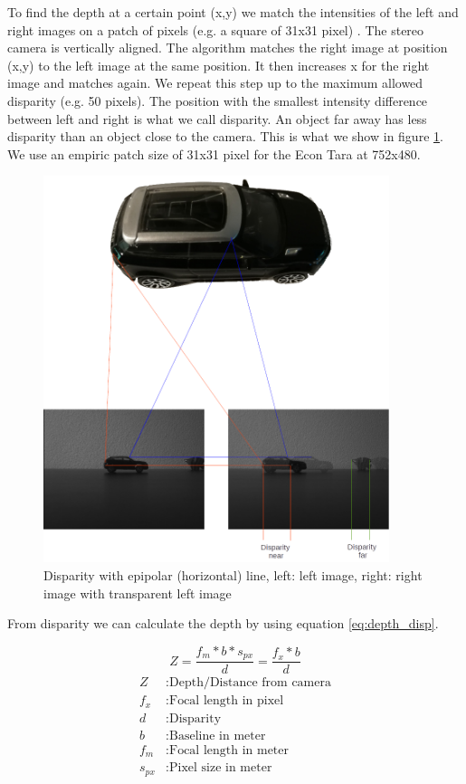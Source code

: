 \documentclass[11pt,a4paper,titlepage,oneside]{report}
\begin{document}
To find the depth at a certain point (x,y) we match the intensities of the left and right images on a patch of pixels (e.g. a square of 31x31 pixel) \cite{rvc}. The stereo camera is vertically aligned. The algorithm matches the right image at position (x,y) to the left image at the same position. It then increases x for the right image and matches again. We repeat this step up to the maximum allowed disparity (e.g. 50 pixels). The position with the smallest intensity difference between left and right is what we call disparity. An object far away has less disparity than an object close to the camera. This is what we show in figure \ref{fig:disparity}. We use an empiric patch size of 31x31 pixel for the Econ Tara at 752x480.

\begin{figure}[H]
  \begin{center}
    \includegraphics[width=0.9\textwidth]{img/disparity_concept.png}
  \end{center}
  \caption{Disparity with epipolar (horizontal) line, left: left image, right: right image with transparent left image}\label{fig:disparity}
\end{figure}

From disparity we can calculate the depth by using equation \ref{eq:depth_disp}.

\begin{equation}\label{eq:depth_disp}
  Z=\frac{f_m*b*s_{px}}{d}=\frac{f_x*b}{d}
\end{equation}
\begin{align*}
  Z        &: \text{Depth/Distance from camera}\\
  f_x      &: \text{Focal length in pixel}\\
  d        &: \text{Disparity}\\
  b        &: \text{Baseline in meter}\\
  f_m      &: \text{Focal length in meter}\\
  s_{px}  &: \text{Pixel size in meter}
\end{align*}
\end{document}
